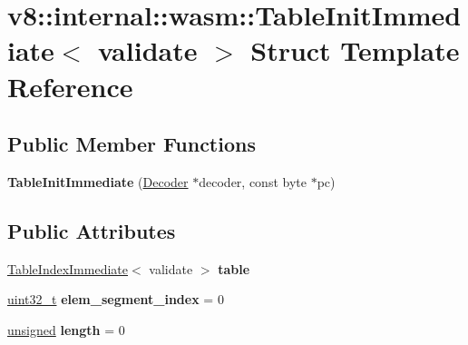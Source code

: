 \hypertarget{structv8_1_1internal_1_1wasm_1_1TableInitImmediate}{}\section{v8\+:\+:internal\+:\+:wasm\+:\+:Table\+Init\+Immediate$<$ validate $>$ Struct Template Reference}
\label{structv8_1_1internal_1_1wasm_1_1TableInitImmediate}
\subsection*{Public Member Functions}
\begin{DoxyCompactItemize}
\item 
\mbox{\label{structv8_1_1internal_1_1wasm_1_1TableInitImmediate_acd9dc33259fcf00e2c95c8783ca1f1f9}} 
{\bfseries Table\+Init\+Immediate} (\mbox{\hyperlink{classv8_1_1internal_1_1wasm_1_1Decoder}{Decoder}} $\ast$decoder, const byte $\ast$pc)
\end{DoxyCompactItemize}
\subsection*{Public Attributes}
\begin{DoxyCompactItemize}
\item 
\mbox{\label{structv8_1_1internal_1_1wasm_1_1TableInitImmediate_a3011b2a8cdd4f1b6549db4cfd2f3f7ad}} 
\mbox{\hyperlink{structv8_1_1internal_1_1wasm_1_1TableIndexImmediate}{Table\+Index\+Immediate}}$<$ validate $>$ {\bfseries table}
\item 
\mbox{\label{structv8_1_1internal_1_1wasm_1_1TableInitImmediate_a98d11b41dfc79dd0e0541deffba911be}} 
\mbox{\hyperlink{classuint32__t}{uint32\+\_\+t}} {\bfseries elem\+\_\+segment\+\_\+index} = 0
\item 
\mbox{\label{structv8_1_1internal_1_1wasm_1_1TableInitImmediate_afae1d5175178e6818e1128eb893ac3eb}} 
\mbox{\hyperlink{classunsigned}{unsigned}} {\bfseries length} = 0
\end{DoxyCompactItemize}


